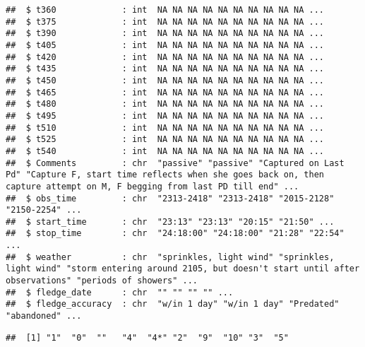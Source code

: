 \documentclass[
]{article}
\newenvironment{Shaded}{\begin{snugshade}}{\end{snugshade}}
\newcommand{\CommentTok}[1]{\textcolor[rgb]{0.56,0.35,0.01}{\textit{#1}}}
\newcommand{\FunctionTok}[1]{\textcolor[rgb]{0.00,0.00,0.00}{#1}}
\newcommand{\NormalTok}[1]{#1}
\newcommand{\SpecialCharTok}[1]{\textcolor[rgb]{0.00,0.00,0.00}{#1}}
\begin{document}
\begin{verbatim}
##  $ t360             : int  NA NA NA NA NA NA NA NA NA NA ...
##  $ t375             : int  NA NA NA NA NA NA NA NA NA NA ...
##  $ t390             : int  NA NA NA NA NA NA NA NA NA NA ...
##  $ t405             : int  NA NA NA NA NA NA NA NA NA NA ...
##  $ t420             : int  NA NA NA NA NA NA NA NA NA NA ...
##  $ t435             : int  NA NA NA NA NA NA NA NA NA NA ...
##  $ t450             : int  NA NA NA NA NA NA NA NA NA NA ...
##  $ t465             : int  NA NA NA NA NA NA NA NA NA NA ...
##  $ t480             : int  NA NA NA NA NA NA NA NA NA NA ...
##  $ t495             : int  NA NA NA NA NA NA NA NA NA NA ...
##  $ t510             : int  NA NA NA NA NA NA NA NA NA NA ...
##  $ t525             : int  NA NA NA NA NA NA NA NA NA NA ...
##  $ t540             : int  NA NA NA NA NA NA NA NA NA NA ...
##  $ Comments         : chr  "passive" "passive" "Captured on Last Pd" "Capture F, start time reflects when she goes back on, then capture attempt on M, F begging from last PD till end" ...
##  $ obs_time         : chr  "2313-2418" "2313-2418" "2015-2128" "2150-2254" ...
##  $ start_time       : chr  "23:13" "23:13" "20:15" "21:50" ...
##  $ stop_time        : chr  "24:18:00" "24:18:00" "21:28" "22:54" ...
##  $ weather          : chr  "sprinkles, light wind" "sprinkles, light wind" "storm entering around 2105, but doesn't start until after observations" "periods of showers" ...
##  $ fledge_date      : chr  "" "" "" "" ...
##  $ fledge_accuracy  : chr  "w/in 1 day" "w/in 1 day" "Predated" "abandoned" ...
\end{verbatim}

\begin{Shaded}
\end{Shaded}

\begin{verbatim}
##  [1] "1"  "0"  ""   "4"  "4*" "2"  "9"  "10" "3"  "5"
\end{verbatim}

\begin{Shaded}
\end{Shaded}
\end{document}
